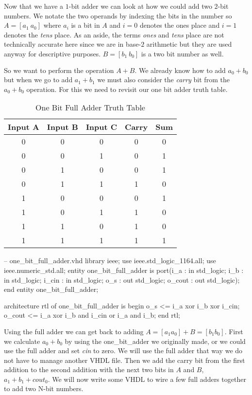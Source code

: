 Now that we have a $1$-bit adder we can look at how we could add two $2$-bit numbers. We notate the two operands by indexing the bits in the number so $A=[a_1~a_0]$ where $a_i$ is a bit in $A$ and $i=0$ denotes the ones place and $i=1$ denotes the \emph{tens} place. As an aside, the terms \emph{ones} and \emph{tens} place are not technically accurate here since we are in base-$2$ arithmetic but they are used anyway for descriptive purposes. $B=[b_1~b_0]$ is a two bit number as well.

So we want to perform the operation $A+B$. We already know how to add $a_0+b_0$ but when we go to add $a_1+b_1$ we must also consider the \emph{carry} bit from the $a_0+b_0$ operation. For this we need to revisit our one bit adder truth table.

\begin{table}[h!]  
\begin{center}    
\caption{One Bit Full Adder Truth Table} 
\label{tab:tt2bfa} 
\begin{tabular}{|c|c|c||c|c|}  
\textbf{Input A} & \textbf{Input B} & \textbf{Input C} & \textbf{Carry} & \textbf{Sum}\\  
\hline  
0 & 0 & 0 & 0 & 0\\  
0 & 0 & 1 & 0 & 1\\  
0 & 1 & 0 & 0 & 1\\  
0 & 1 & 1 & 1 & 0\\  
1 & 0 & 0 & 0 & 1\\  
1 & 0 & 1 & 1 & 0\\  
1 & 1 & 0 & 1 & 0\\  
1 & 1 & 1 & 1 & 1\\ 
\end{tabular}  
\end{center}
\end{table}

\begin{VHDLlisting}[tabsize=4]
-- one_bit_full_adder.vhd
library ieee; 
    use ieee.std_logic_1164.all; 
    use ieee.numeric_std.all; 
entity one_bit_full_adder is
port(i_a    : in    std_logic;  
     i_b    : in    std_logic;  
     i_cin  : in    std_logic;  
     o_s    :   out std_logic;  
     o_cout :   out std_logic);
end entity one_bit_full_adder;

architecture rtl of one_bit_full_adder is
begin 
    o_s <= i_a xor i_b xor i_cin; 
    o_cout <= i_a xor i_b and i_cin or i_a and i_b;
end rtl;
\end{VHDLlisting}

Using the full adder we can get back to adding $A=[a_1 a_0] + B=[b_1 b_0]$. First we calculate $a_0 + b_0$ by using the one\_bit\_adder we originally made, or we could use the full adder and set \emph{cin} to zero. We will use the full adder that way we do not have to manage another \ac{VHDL} file. Then we add the carry bit from the first addition to the second addition with the next two bits in $A$ and $B$, $a_1 + b_1 + cout_0$. We will now write some \ac{VHDL} to wire a few full adders together to add two N-bit numbers.  

